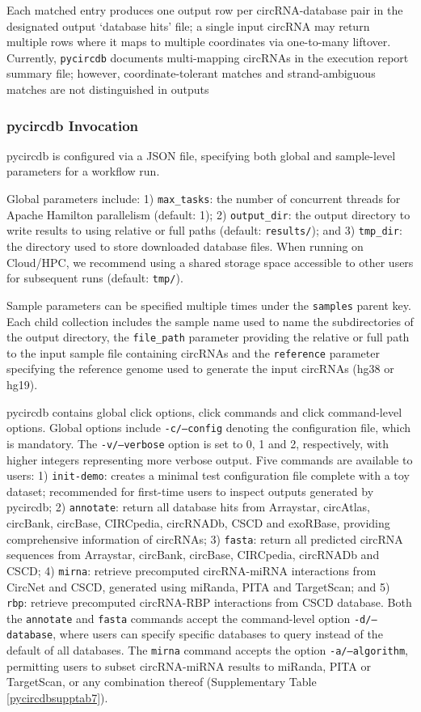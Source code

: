 Each matched entry produces one output row per circRNA-database pair in the designated output `database hits' file; a single input circRNA may return multiple rows where it maps to multiple coordinates via one-to-many liftover. Currently, \texttt{pycircdb} documents multi-mapping circRNAs in the execution report summary file; however, coordinate-tolerant matches and strand-ambiguous matches are not distinguished in outputs

\subsubsection{pycircdb Invocation}
pycircdb is configured via a JSON file, specifying both global and sample-level parameters for a workflow run. 

Global parameters include: 1) \texttt{max\_tasks}: the number of concurrent threads for Apache Hamilton parallelism (default: 1); 2) \texttt{output\_dir}: the output directory to write results to using relative or full paths (default: \texttt{results/}); and 3) \texttt{tmp\_dir}: the directory used to store downloaded database files. When running on Cloud/HPC, we recommend using a shared storage space accessible to other users for subsequent runs (default: \texttt{tmp/}).

Sample parameters can be specified multiple times under the \texttt{samples} parent key. Each child collection includes the sample name used to name the subdirectories of the output directory, the \texttt{file\_path} parameter providing the relative or full path to the input sample file containing circRNAs and the \texttt{reference} parameter specifying the reference genome used to generate the input circRNAs (hg38 or hg19).

pycircdb contains global click options, click commands and click command-level options. Global options include \texttt{-c/--config} denoting the configuration file, which is mandatory. The \texttt{-v/--verbose} option is set to 0, 1 and 2, respectively, with higher integers representing more verbose output. Five commands are available to users: 1) \texttt{init-demo}: creates a minimal test configuration file complete with a toy dataset; recommended for first-time users to inspect outputs generated by pycircdb; 2) \texttt{annotate}: return all database hits from Arraystar, circAtlas, circBank, circBase, CIRCpedia, circRNADb, CSCD and exoRBase, providing comprehensive information of circRNAs; 3) \texttt{fasta}: return all predicted circRNA sequences from Arraystar, circBank, circBase, CIRCpedia, circRNADb and CSCD; 4) \texttt{mirna}: retrieve precomputed circRNA-miRNA interactions from CircNet and CSCD, generated using miRanda, PITA and TargetScan; and 5) \texttt{rbp}: retrieve precomputed circRNA-RBP interactions from CSCD database. Both the \texttt{annotate} and \texttt{fasta} commands accept the command-level option \texttt{-d/--database}, where users can specify specific databases to query instead of the default of all databases. The \texttt{mirna} command accepts the option \texttt{-a/--algorithm}, permitting users to subset circRNA-miRNA results to miRanda, PITA or TargetScan, or any combination thereof (Supplementary Table \ref{pycircdbsupptab7}). 

